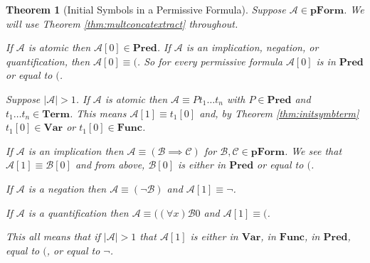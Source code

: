 \documentclass[12pt]{article}
\theoremstyle{break}
\theoremstyle{break}
\newtheorem{theorem}{Theorem}[section]
\theoremstyle{break}
\theoremstyle{break}
\newcommand{\mc}[1]{\mathcal{#1}}
\begin{document}
\begin{theorem}[Initial Symbols in a Permissive Formula]
\label{thm:initsymbform}
Suppose $\mc{A}\in \textbf{pForm}$.
We will use Theorem \ref{thm:multconcatextract} throughout.

If $\mc{A}$ is atomic then $\mc{A}[0] \in \textbf{Pred}$.
If $\mc{A}$ is an implication, negation, or quantification, then $\mc{A}[0] \equiv ($. So for every permissive formula $\mc{A}[0]$ is in $\textbf{Pred}$ or equal to $($.

Suppose $|\mc{A}| > 1$.
If $\mc{A}$ is atomic then $\mc{A}\equiv Pt_1\ldots t_n$ with $P\in\textbf{Pred}$ and $t_1\ldots t_n\in\textbf{Term}$.
This means $\mc{A}[1]\equiv t_1[0]$ and, by Theorem \ref{thm:initsymbterm} $t_1[0]\in\textbf{Var}$ or $t_1[0]\in\textbf{Func}$.

If $\mc{A}$ is an implication then $\mc{A}\equiv (\mc{B}\implies \mc{C})$ for $\mc{B},\mc{C}\in\textbf{pForm}$.
We see that $\mc{A}[1]\equiv \mc{B}[0]$ and from above, $\mc{B}[0]$ is either in $\textbf{Pred}$ or equal to $($.

If $\mc{A}$ is a negation then $\mc{A}\equiv (\lnot \mc{B})$ and $\mc{A}[1] \equiv \lnot$.

If $\mc{A}$ is a quantification then $\mc{A}\equiv ((\forall x)\mc{B}0$ and $\mc{A}[1] \equiv ($.

This all means that if $|\mc{A}|>1$ that $\mc{A}[1]$ is either in $\textbf{Var}$, in $\textbf{Func}$, in $\textbf{Pred}$, equal to $($, or equal to $\lnot$.
\end{theorem}
\end{document}
